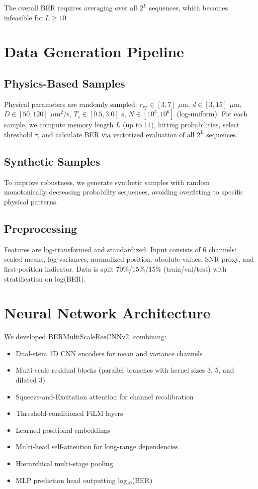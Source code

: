 \documentclass[a4paper,12pt]{report}
\begin{document}
The overall BER requires averaging over all $2^L$ sequences, which becomes infeasible for $L \geq 10$.

\section{Data Generation Pipeline}

\subsection{Physics-Based Samples}

Physical parameters are randomly sampled: $r_{rx} \in [3, 7]$ $\mu$m, $d \in [3, 15]$ $\mu$m, $D \in [50, 120]$ $\mu$m$^2$/s, $T_s \in [0.5, 3.0]$ s, $N \in [10^3, 10^6]$ (log-uniform). For each sample, we compute memory length $L$ (up to 14), hitting probabilities, select threshold $\tau$, and calculate BER via vectorized evaluation of all $2^L$ sequences.

\subsection{Synthetic Samples}

To improve robustness, we generate synthetic samples with random monotonically decreasing probability sequences, avoiding overfitting to specific physical patterns.

\subsection{Preprocessing}

Features are log-transformed and standardized. Input consists of 6 channels: scaled means, log-variances, normalized position, absolute values, SNR proxy, and first-position indicator. Data is split 70\%/15\%/15\% (train/val/test) with stratification on log(BER).

\section{Neural Network Architecture}

We developed BERMultiScaleResCNNv2, combining:
\begin{itemize}
    \item Dual-stem 1D CNN encoders for mean and variance channels
    \item Multi-scale residual blocks (parallel branches with kernel sizes 3, 5, and dilated 3)
    \item Squeeze-and-Excitation attention for channel recalibration
    \item Threshold-conditioned FiLM layers
    \item Learned positional embeddings
    \item Multi-head self-attention for long-range dependencies
    \item Hierarchical multi-stage pooling
    \item MLP prediction head outputting log$_{10}$(BER)
\end{itemize}
\end{document}
